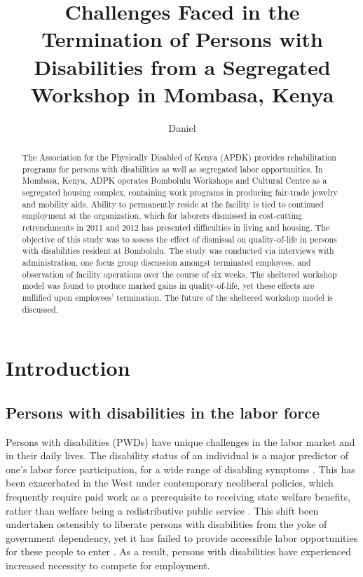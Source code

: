 \documentclass[american]{../../../coursework}
\title{Challenges Faced in the Termination of Persons with Disabilities from a Segregated Workshop in Mombasa, Kenya}
\subtitle{}
\author{Daniel}{Glenn}{Leonard}
\date{\DTMUsedate{date}}
\begin{document}
\maketitle

\begin{abstract}
    The Association for the Physically Disabled of Kenya (APDK) provides
    rehabilitation programs for persons with disabilities as well as
    segregated labor opportunities. In Mombasa, Kenya, ADPK operates
    Bombolulu Workshops and Cultural Centre as a segregated housing
    complex, containing work programs in producing fair-trade jewelry and
    mobility aids. Ability to permanently reside at the facility is tied to
    continued employment at the organization, which for laborers dismissed in
    cost-cutting retrenchments in 2011 and 2012 has presented difficulties in
    living and housing. The objective of this study was to assess the effect
    of dismissal on quality-of-life in persons with disabilities resident at
    Bombolulu. The study was conducted via interviews with administration, one
    focus group discussion amongst terminated employees, and observation of
    facility operations over the course of six weeks. The sheltered workshop
    model was found to produce marked gains in quality-of-life, yet these
    effects are nullified upon employees' termination. The future of the
    sheltered workshop model is discussed.
\end{abstract}

\printkeywords

\section{Introduction}

\subsection{Persons with disabilities in the labor force}

Persons with disabilities (PWDs) have unique challenges in the labor market
and in their daily lives.
The disability status of an individual is a major predictor of one's labor
force participation, for a wide range of disabling symptoms
\parencite{Stern1989}. This has been exacerbated in the West under
contemporary neoliberal policies, which frequently require paid work as a
prerequisite to receiving state welfare benefits, rather than welfare being a
redistributive public service \parencite{Lister1998,Wilton2006}. This shift
been undertaken ostensibly to liberate persons with disabilities from the yoke
of government dependency, yet it has failed to provide accessible labor
opportunities for these people to enter \parencite{Wilton2006}. As a result,
persons with disabilities have experienced increased necessity to compete for
employment.
\end{document}
